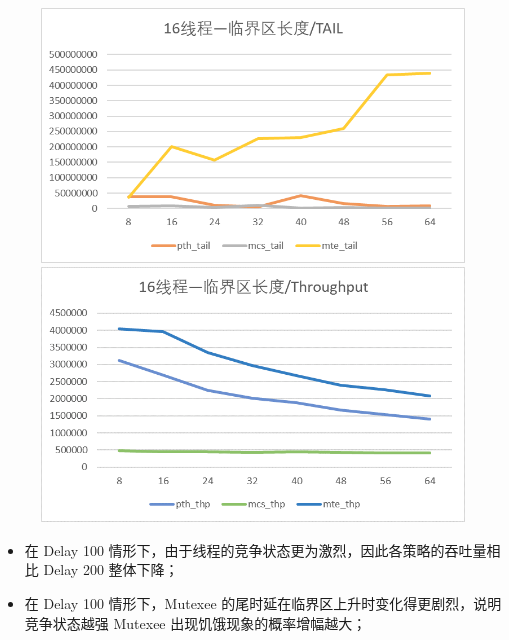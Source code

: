 \documentclass[UTF8]{ctexart}
\begin{document}
\begin{enumerate}
    \begin{figure}[!h]
        \centering
        \begin{minipage}{0.49\linewidth}
            \centering
            \includegraphics[scale=0.64]{../images/7.png}
        \end{minipage}
        \begin{minipage}{0.49\linewidth}
            \centering
            \includegraphics[scale=0.64]{../images/8.png}
        \end{minipage}
    \end{figure}

    \begin{itemize}
        \item 在 Delay 100 情形下，由于线程的竞争状态更为激烈，因此各策略的吞吐量相比 Delay 200 整体下降；
        \item 在 Delay 100 情形下，Mutexee 的尾时延在临界区上升时变化得更剧烈，说明竞争状态越强 Mutexee 出现饥饿现象的概率增幅越大；
    \end{itemize}

\end{enumerate}
\end{document}
